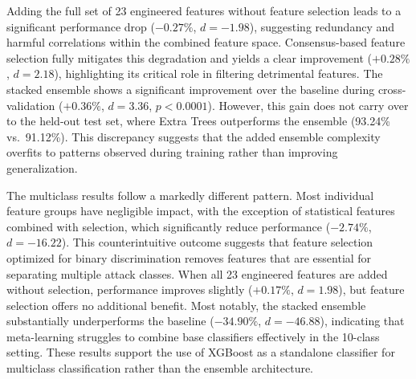 \documentclass[pdflatex,sn-mathphys-num]{sn-jnl}
\theoremstyle{thmstyleone}%
\theoremstyle{thmstyletwo}%
\theoremstyle{thmstylethree}%
\begin{document}
Adding the full set of 23 engineered features without feature selection leads to a significant performance drop ($-0.27\%$, $d = -1.98$), suggesting redundancy and harmful correlations within the combined feature space. Consensus-based feature selection fully mitigates this degradation and yields a clear improvement ($+0.28\%$, $d = 2.18$), highlighting its critical role in filtering detrimental features. The stacked ensemble shows a significant improvement over the baseline during cross-validation ($+0.36\%$, $d = 3.36$, $p < 0.0001$). However, this gain does not carry over to the held-out test set, where Extra Trees outperforms the ensemble (93.24\% vs.\ 91.12\%). This discrepancy suggests that the added ensemble complexity overfits to patterns observed during training rather than improving generalization.


The multiclass results follow a markedly different pattern. Most individual feature groups have negligible impact, with the exception of statistical features combined with selection, which significantly reduce performance ($-2.74\%$, $d = -16.22$). This counterintuitive outcome suggests that feature selection optimized for binary discrimination removes features that are essential for separating multiple attack classes. When all 23 engineered features are added without selection, performance improves slightly ($+0.17\%$, $d = 1.98$), but feature selection offers no additional benefit. Most notably, the stacked ensemble substantially underperforms the baseline ($-34.90\%$, $d = -46.88$), indicating that meta-learning struggles to combine base classifiers effectively in the 10-class setting. These results support the use of XGBoost as a standalone classifier for multiclass classification rather than the ensemble architecture.
\end{document}
